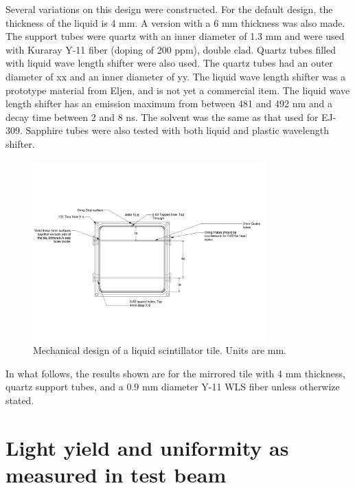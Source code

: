 \documentclass[review]{elsarticle}
\begin{document}
Several variations on this design were constructed.  For the default design, the thickness of the liquid is 4 mm.  A version with a 6 mm thickness was also made.  The support tubes were quartz with an inner diameter of 1.3 mm and were used with Kuraray Y-11 fiber (doping of 200 ppm), double clad.  Quartz tubes filled with liquid wave length shifter were also used.  The quartz tubes had
an outer diameter of xx and an inner diameter of yy.  The liquid wave length shifter was a prototype material from Eljen, and is not yet a commercial item.
The liquid wave length shifter has an emission maximum from between 
481 and 492 nm and a decay time between 2 and 8 ns.  
The solvent was the same as that used for EJ-309.
Sapphire tubes were also tested with both liquid and plastic wavelength shifter.


\begin{figure}[!ht]
\begin{center}
\includegraphics[width=0.8\textwidth]{mechanicaldesign.pdf}
\caption{
Mechanical design of a liquid scintillator tile.  Units are mm.
}
\label{fig:tiledesign}
\end{center}
\end{figure}

In what follows, the results shown are for the mirrored tile with 4 mm thickness, quartz support tubes, and a 0.9 mm diameter Y-11 WLS fiber unless otherwize stated.

\section{Light yield and uniformity as measured in test beam}
\end{document}
